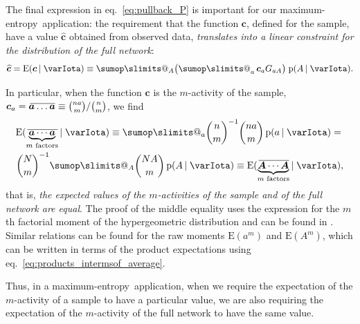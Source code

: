 \documentclass[\ifafour a4paper,12pt,\else a5paper,10pt,\fi%
onecolumn,oneside,article,%
british%
]{memoir}
\makeatletter
\theoremstyle{remark}
\theoremstyle{innote}
\def\sum{\DOTSI\sumop\slimits@}
\newcommand*{\pf}{\mathrm{p}}%
\newcommand*{\p}{\mathrm{P}}%
\newcommand*{\E}{\mathrm{E}}
\renewcommand*{\|}{\nonscript\,\vert\nonscript\;\mathopen{}}
\newcommand*{\eqn}{eq.}%
\newcommand*{\tsum}{\mathop{\textstyle\sum}\nolimits}
\newcommand*{\widebar}[1]{{\mkern1.5mu\skew{2}\overline{\mkern-1.5mu#1\mkern-1.5mu}\mkern 1.5mu}}
\newcommand*{\av}{\widebar} %
\newcommand*{\sav}{\widebar} %
\newcommand*{\ypp}{G}
\newcommand*{\yAv}{A}
\newcommand*{\yav}{a}
\newcommand*{\yNv}{N}
\newcommand*{\yaa}{\bm{\yav}}%
\newcommand*{\ya}{\yav}%
\newcommand*{\yAA}{\bm{\yAv}}%
\newcommand*{\yA}{\yAv}%
\newcommand*{\yH}{\varIota}
\newcommand*{\yg}{\bm{c}}
\newcommand*{\yc}{\widehat{\bm{c}}}
\newcommand*{\me}{maximum-entropy}
\makeatother
\begin{document}
\bigskip

The final expression in \eqn~\eqref{eq:pullback_P} is important for our
\me\ application: the requirement that the function $\yg$, defined for the
sample, have a  value $\yc$ obtained from observed data,
\emph{translates into a linear constraint for the distribution of the full
  network}:
\begin{equation}
  \label{eq:constraint_extended}
  \yc = \E(\yg \| \yH) \equiv \sum_{\yA} \bigl( \tsum_{\ya} \yg_{\ya}  \ypp_{\ya\yA} \bigr)\;
  \pf(\yA \| \yH).
\end{equation}

In particular, when the function $\yg$ is the $m$-activity of the sample,
$\yg_{\ya} = \sav{\yaa\dotso\yaa} \equiv \binom{n\ya}{m}/\binom{n}{m}$, we
find
\begin{multline}
  \label{eq:expe_products}
  \E(\sav{\underbrace{\yaa \dotsm \yaa}_{\text{$m$ factors}}} \| \yH)
\equiv
    \sum_{\ya} %
    \binom{n}{m}^{-1}
    \binom{n \ya}{m}\, \pf(\ya \| \yH)
    ={}\\
    \binom{\yNv}{m}^{-1}
    \sum_{\yA} %
    \binom{\yNv \yA}{m}\, \pf(\yA \| \yH)
\equiv    \E(\av{\underbrace{\yAA \dotsm \yAA}_{\text{$m$ factors}}} \| \yH),
\end{multline}
that is, \emph{the expected values of the $m$-activities of the sample and
  of the full network are equal}. The proof of the middle equality uses
the expression for the $m$th factorial moment of the hypergeometric
distribution and can be found in \textcite{potts1953}. Similar relations
can be found for the raw moments $\E(\ya^m)$ and $\E(\yA^m)$, which
can be written in terms of the product expectations using
\eqn~\eqref{eq:products_intermsof_average}.

Thus, in a \me\ application, when we require the expectation of the
$m$-activity of a sample to have a particular value, we are also
requiring  the expectation of the $m$-activity of the full network to
have the same value.
\end{document}

